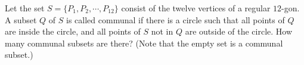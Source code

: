 Let the set $S = \{P_1, P_2, \cdots, P_{12}\}$ consist of the twelve vertices of a regular $12$-gon. A subset $Q$ of $S$ is called communal if there is a circle such that all points of $Q$ are inside the circle, and all points of $S$ not in $Q$ are outside of the circle. How many communal subsets are there? (Note that the empty set is a communal subset.)